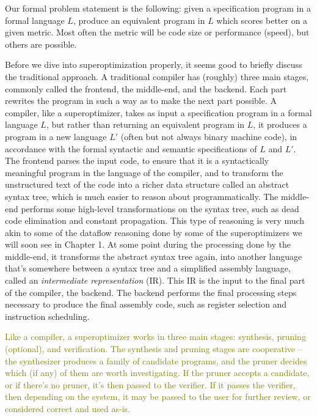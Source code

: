 \documentclass[12pt,twoside]{reedthesis}
\newcommand{\green}[1]{\textcolor{olive}{#1}}
\begin{document}
    Our formal problem statement is the following: given a specification program in a formal language $L$, produce an equivalent program in $L$ which scores better on a given metric.
    Most often the metric will be code size or performance (speed), but others are possible.
    
    Before we dive into superoptimization properly, it seems good to briefly discuss the traditional approach\footnotemark.
    A traditional compiler has (roughly) three main stages, commonly called the frontend, the middle-end, and the backend.
    Each part rewrites the program in such a way as to make the next part possible.
    A compiler, like a superoptimizer, takes as input a specification program in a formal language $L$, but rather than returning an equivalent program in $L$, it produces a program in a new language $L'$ (often but not always binary machine code), in accordance with the formal syntactic and semantic specifications of $L$ and $L'$.
    The frontend parses the input code, to ensure that it is a syntactically meaningful program in the language of the compiler, and to transform the unstructured text of the code into a richer data structure called an abstract syntax tree, which is much easier to reason about programmatically.
    The middle-end performs some high-level transformations on the syntax tree, such as dead code elimination and constant propagation.
    This type of reasoning is very much akin to some of the dataflow reasoning done by some of the superoptimizers we will soon see in Chapter 1. 
    At some point during the processing done by the middle-end, it transforms the abstract syntax tree again, into another language that's somewhere between a syntax tree and a simplified assembly language, called an \textit{intermediate representation} (IR).
    This IR is the input to the final part of the compiler, the backend.
    The backend performs the final processing steps necessary to produce the final assembly code, such as register selection and instruction scheduling.
    
    
    \green{
    Like a compiler, a superoptimizer works in three main stages: synthesis, pruning (optional), and verification.
    The synthesis and pruning stages are cooperative -- the synthesizer produces a family of candidate programs, and the pruner decides which (if any) of them are worth investigating.
    If the pruner accepts a candidate, or if there's no pruner, it's then passed to the verifier. 
    If it passes the verifier, then depending on the system, it may be passed to the user for further review, or considered correct and used as-is.
    }
    
\end{document}
